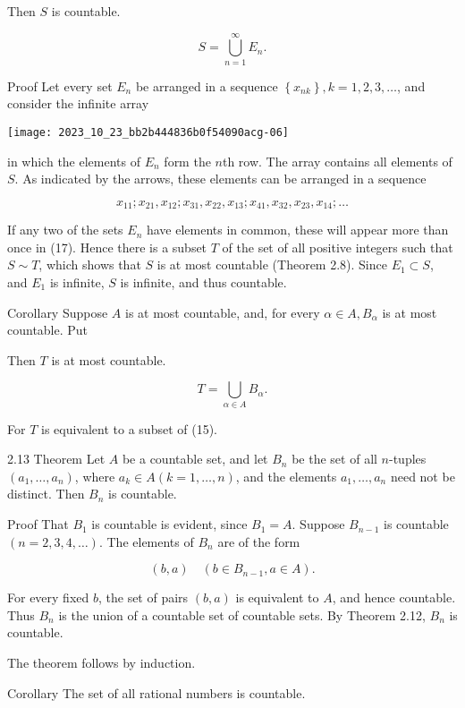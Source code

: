 \documentclass[10pt]{article}
\begin{document}
Then $S$ is countable.

$$
S=\bigcup_{n=1}^{\infty} E_{n} .
$$

Proof Let every set $E_{n}$ be arranged in a sequence $\left\{x_{n k}\right\}, k=1,2,3, \ldots$, and consider the infinite array

\begin{center}
\texttt{[image: 2023\_10\_23\_bb2b444836b0f54090acg-06]}
\end{center}

in which the elements of $E_{n}$ form the $n$th row. The array contains all elements of $S$. As indicated by the arrows, these elements can be arranged in a sequence

$$
x_{11} ; x_{21}, x_{12} ; x_{31}, x_{22}, x_{13} ; x_{41}, x_{32}, x_{23}, x_{14} ; \ldots
$$

If any two of the sets $E_{n}$ have elements in common, these will appear more than once in (17). Hence there is a subset $T$ of the set of all positive integers such that $S \sim T$, which shows that $S$ is at most countable (Theorem 2.8). Since $E_{1} \subset S$, and $E_{1}$ is infinite, $S$ is infinite, and thus countable.

Corollary Suppose $A$ is at most countable, and, for every $\alpha \in A, B_{\alpha}$ is at most countable. Put

Then $T$ is at most countable.

$$
T=\bigcup_{\alpha \in A} B_{\alpha} .
$$

For $T$ is equivalent to a subset of (15).

2.13 Theorem Let $A$ be a countable set, and let $B_{n}$ be the set of all $n$-tuples $\left(a_{1}, \ldots, a_{n}\right)$, where $a_{k} \in A(k=1, \ldots, n)$, and the elements $a_{1}, \ldots, a_{n}$ need not be distinct. Then $B_{n}$ is countable.

Proof That $B_{1}$ is countable is evident, since $B_{1}=A$. Suppose $B_{n-1}$ is countable $(n=2,3,4, \ldots)$. The elements of $B_{n}$ are of the form

$$
(b, a) \quad\left(b \in B_{n-1}, a \in A\right) .
$$

For every fixed $b$, the set of pairs $(b, a)$ is equivalent to $A$, and hence countable. Thus $B_{n}$ is the union of a countable set of countable sets. By Theorem 2.12, $B_{n}$ is countable.

The theorem follows by induction.

Corollary The set of all rational numbers is countable.
\end{document}
